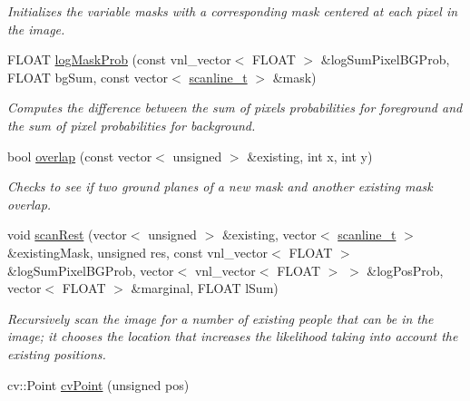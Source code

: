 \begin{DoxyCompactItemize}
\begin{DoxyCompactList}\small\item\em Initializes the variable {\ttfamily masks} with a corresponding mask centered at each pixel in the image. \item\end{DoxyCompactList}\item 
\hypertarget{classfindPersonStream_a6b95d49b3823153588b59dbbda5c8949}{
FLOAT \hyperlink{classfindPersonStream_a6b95d49b3823153588b59dbbda5c8949}{logMaskProb} (const vnl\_\-vector$<$ FLOAT $>$ \&logSumPixelBGProb, FLOAT bgSum, const vector$<$ \hyperlink{structscanline__t}{scanline\_\-t} $>$ \&mask)}
\label{classfindPersonStream_a6b95d49b3823153588b59dbbda5c8949}

\begin{DoxyCompactList}\small\item\em Computes the difference between the sum of pixels probabilities for foreground and the sum of pixel probabilities for background. \item\end{DoxyCompactList}\item 
\hypertarget{classfindPersonStream_aaf033810455a87eb5f32cfed75b5519e}{
bool \hyperlink{classfindPersonStream_aaf033810455a87eb5f32cfed75b5519e}{overlap} (const vector$<$ unsigned $>$ \&existing, int x, int y)}
\label{classfindPersonStream_aaf033810455a87eb5f32cfed75b5519e}

\begin{DoxyCompactList}\small\item\em Checks to see if two ground planes of a new mask and another existing mask overlap. \item\end{DoxyCompactList}\item 
\hypertarget{classfindPersonStream_aeaa599e1b4d6636083ef059bd029539b}{
void \hyperlink{classfindPersonStream_aeaa599e1b4d6636083ef059bd029539b}{scanRest} (vector$<$ unsigned $>$ \&existing, vector$<$ \hyperlink{structscanline__t}{scanline\_\-t} $>$ \&existingMask, unsigned res, const vnl\_\-vector$<$ FLOAT $>$ \&logSumPixelBGProb, vector$<$ vnl\_\-vector$<$ FLOAT $>$ $>$ \&logPosProb, vector$<$ FLOAT $>$ \&marginal, FLOAT lSum)}
\label{classfindPersonStream_aeaa599e1b4d6636083ef059bd029539b}

\begin{DoxyCompactList}\small\item\em Recursively scan the image for a number of existing people that can be in the image; it chooses the location that increases the likelihood taking into account the existing positions. \item\end{DoxyCompactList}\item 
\hypertarget{classfindPersonStream_ac8da170ee071392aeef5385795d4bc3e}{
cv::Point \hyperlink{classfindPersonStream_ac8da170ee071392aeef5385795d4bc3e}{cvPoint} (unsigned pos)}
\label{classfindPersonStream_ac8da170ee071392aeef5385795d4bc3e}


\end{DoxyCompactItemize}
